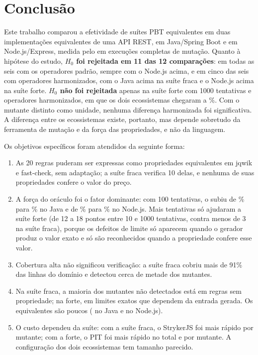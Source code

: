 \section{Conclusão}

Este trabalho comparou a efetividade de suítes PBT equivalentes em duas implementações equivalentes de uma API REST, em Java/Spring Boot e em Node.js/Express, medida pelo \ms{} em \totalExecucoes{} execuções completas de mutação. Quanto à hipótese do estudo, \textbf{$H_0$ foi rejeitada em 11 das 12 comparações}: em todas as seis com os operadores padrão, sempre com o Node.js acima, e em cinco das seis com operadores harmonizados, com o Java acima na suíte fraca e o Node.js acima na suíte forte. \textbf{$H_0$ não foi rejeitada} apenas na suíte forte com 1000 tentativas e operadores harmonizados, em que os dois ecossistemas chegaram a \mshJavaForteMil\%. Com o mutante distinto como unidade, nenhuma diferença harmonizada foi significativa. A diferença entre os ecossistemas existe, portanto, mas depende sobretudo da ferramenta de mutação e da força das propriedades, e não da linguagem.

Os objetivos específicos foram atendidos da seguinte forma:

\begin{enumerate}[label=\textbf{OE\arabic*}, leftmargin=1.6cm, itemsep=1pt]
  \item As 20 regras puderam ser expressas como propriedades equivalentes em jqwik e fast-check, sem adaptação; a suíte fraca verifica 10 delas, e nenhuma de suas propriedades confere o valor do preço.
  \item A força do oráculo foi o fator dominante: com 100 tentativas, o \ms{} subiu de \msJavaFracaCem\% para \msJavaForteCem\% no Java e de \msNodeFracaCem\% para \msNodeForteCem\% no Node.js. Mais tentativas só ajudaram a suíte forte (de 12 a 18 pontos entre 10 e 1000 tentativas, contra menos de 3 na suíte fraca), porque os defeitos de limite só aparecem quando o gerador produz o valor exato e só são reconhecidos quando a propriedade confere esse valor.
  \item Cobertura alta não significou verificação: a suíte fraca cobriu mais de 91\% das linhas do domínio e detectou cerca de metade dos mutantes.
  \item Na suíte fraca, a maioria dos mutantes não detectados está em regras sem propriedade; na forte, em limites exatos que dependem da entrada gerada. Os equivalentes são poucos (\clsJavaForteEquivalente{} no Java e \clsNodeForteEquivalente{} no Node.js).
  \item O custo dependeu da suíte: com a suíte fraca, o StrykerJS foi mais rápido por mutante; com a forte, o PIT foi mais rápido no total e por mutante. A configuração dos dois ecossistemas tem tamanho parecido.
\end{enumerate}

